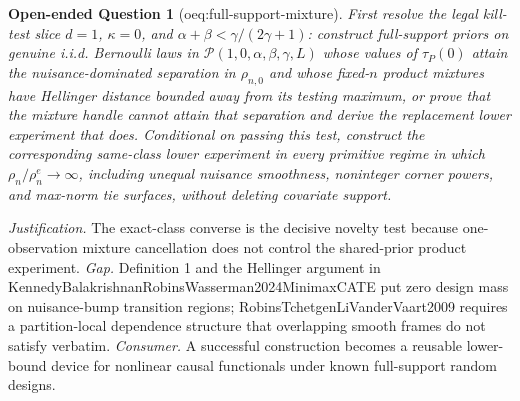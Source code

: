 \documentclass{article}
\newtheorem{openendedquestion}{Open-ended Question}
\begin{document}
\begin{openendedquestion}[oeq:full-support-mixture]\label{oeq:full-support-mixture}
First resolve the legal kill-test slice \(d=1\), \(\kappa=0\), and \(\alpha+\beta<\gamma/(2\gamma+1)\): construct full-support priors on genuine i.i.d. Bernoulli laws in \(\mathcal P(1,0,\alpha,\beta,\gamma,L)\) whose values of \(\tau_P(0)\) attain the nuisance-dominated separation in \(\rho_{n,0}\) and whose fixed-\(n\) product mixtures have Hellinger distance bounded away from its testing maximum, or prove that the mixture handle cannot attain that separation and derive the replacement lower experiment that does. Conditional on passing this test, construct the corresponding same-class lower experiment in every primitive regime in which \(\rho_n/\rho_n^e\to\infty\), including unequal nuisance smoothness, noninteger corner powers, and max-norm tie surfaces, without deleting covariate support.
\end{openendedquestion}
\par\smallskip\noindent \textit{Justification.} The exact-class converse is the decisive novelty test because one-observation mixture cancellation does not control the shared-prior product experiment. \textit{Gap.} Definition 1 and the Hellinger argument in KennedyBalakrishnanRobinsWasserman2024MinimaxCATE put zero design mass on nuisance-bump transition regions; RobinsTchetgenLiVanderVaart2009 requires a partition-local dependence structure that overlapping smooth frames do not satisfy verbatim. \textit{Consumer.} A successful construction becomes a reusable lower-bound device for nonlinear causal functionals under known full-support random designs.
\end{document}
